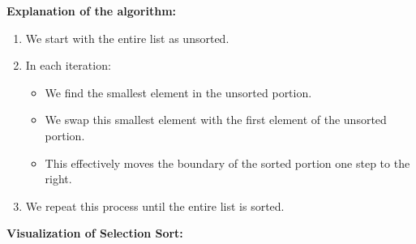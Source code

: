 \begin{Shaded}
\begin{Highlighting}[]
\OperatorTok{=} 
    
     
\OperatorTok{=}
         \OperatorTok{+}
            \OperatorTok{\textless{}}
\OperatorTok{=}
        
\OperatorTok{=}
    
\end{Highlighting}
\end{Shaded}

\textbf{Explanation of the algorithm:}

\begin{enumerate}
\def\labelenumi{\arabic{enumi}.}
\tightlist
\item
  We start with the entire list as unsorted.
\item
  In each iteration:

  \begin{itemize}
  \tightlist
  \item
    We find the smallest element in the unsorted portion.
  \item
    We swap this smallest element with the first element of the unsorted
    portion.
  \item
    This effectively moves the boundary of the sorted portion one step
    to the right.
  \end{itemize}
\item
  We repeat this process until the entire list is sorted.
\end{enumerate}

\textbf{Visualization of Selection Sort:}

\begin{Shaded}
\begin{Highlighting}[]
\end{Highlighting}
\end{Shaded}

